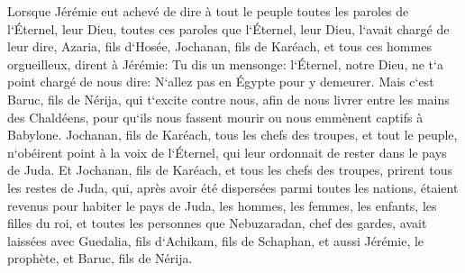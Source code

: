 \verse Lorsque Jérémie eut achevé de dire à tout le peuple toutes les paroles de l`Éternel, leur Dieu, toutes ces paroles que l`Éternel, leur Dieu, l`avait chargé de leur dire, 
\verse Azaria, fils d`Hosée, Jochanan, fils de Karéach, et tous ces hommes orgueilleux, dirent à Jérémie: Tu dis un mensonge: l`Éternel, notre Dieu, ne t`a point chargé de nous dire: N`allez pas en Égypte pour y demeurer. 
\verse Mais c`est Baruc, fils de Nérija, qui t`excite contre nous, afin de nous livrer entre les mains des Chaldéens, pour qu`ils nous fassent mourir ou nous emmènent captifs à Babylone. 
\verse Jochanan, fils de Karéach, tous les chefs des troupes, et tout le peuple, n`obéirent point à la voix de l`Éternel, qui leur ordonnait de rester dans le pays de Juda. 
\verse Et Jochanan, fils de Karéach, et tous les chefs des troupes, prirent tous les restes de Juda, qui, après avoir été dispersées parmi toutes les nations, étaient revenus pour habiter le pays de Juda, 
\verse les hommes, les femmes, les enfants, les filles du roi, et toutes les personnes que Nebuzaradan, chef des gardes, avait laissées avec Guedalia, fils d`Achikam, fils de Schaphan, et aussi Jérémie, le prophète, et Baruc, fils de Nérija. 
